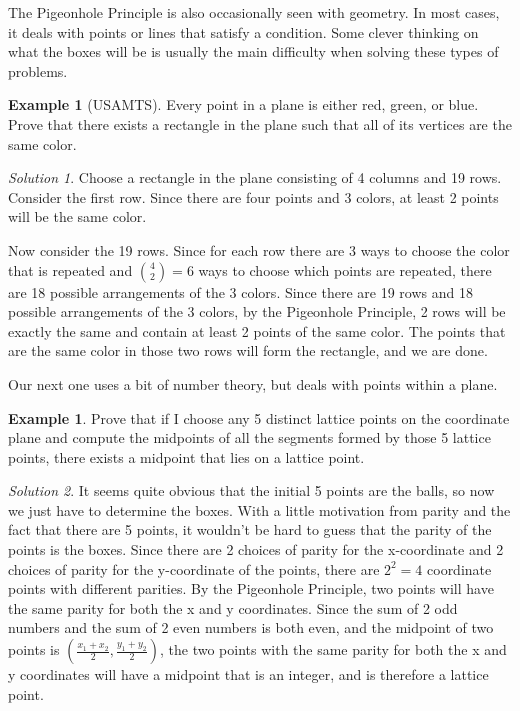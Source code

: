 \documentclass[l1pt]{article}
\theoremstyle{plain}
\theoremstyle{definition}
\newtheorem{example}[thm]{Example}
\theoremstyle{remark}
\newtheorem*{solution}{Solution}
\begin{document}
The Pigeonhole Principle is also occasionally seen with geometry. In most cases, it deals with points or lines that satisfy a condition. Some clever thinking on what the boxes will be is usually the main difficulty when solving these types of problems.

\begin{example}[USAMTS]
Every point in a plane is either red, green, or blue. Prove that there exists a rectangle in the plane such that all of its vertices are the same color.
\end{example}

\begin{solution}
Choose a rectangle in the plane consisting of 4 columns and 19 rows. Consider the first row. Since there are four points and 3 colors, at least 2 points will be the same color. 

Now consider the 19 rows. Since for each row there are 3 ways to choose the color that is repeated and $\binom{4}{2}=6$ ways to choose which points are repeated, there are 18 possible arrangements of the 3 colors. Since there are 19 rows and 18 possible arrangements of the 3 colors, by the Pigeonhole Principle, 2 rows will be exactly the same and contain at least 2 points of the same color. The points that are the same color in those two rows will form the rectangle, and we are done.
\end{solution}

Our next one uses a bit of number theory, but deals with points within a plane.

\begin{example}
Prove that if I choose any 5 distinct lattice points on the coordinate plane and compute the midpoints of all the segments formed by those 5 lattice points, there exists a midpoint that lies on a lattice point.
\end{example}

\begin{solution}
It seems quite obvious that the initial 5 points are the balls, so now we just have to determine the boxes. With a little motivation from parity and the fact that there are 5 points, it wouldn't be hard to guess that the parity of the points is the boxes. Since there are 2 choices of parity for the x-coordinate and 2 choices of parity for the y-coordinate of the points, there are $2^2=4$ coordinate points with different parities. By the Pigeonhole Principle, two points will have the same parity for both the x and y coordinates. Since the sum of 2 odd numbers and the sum of 2 even numbers is both even, and the midpoint of two points is $\left (\frac{x_1+x_2}{2}, \frac{y_1+y_2}{2} \right )$, the two points with the same parity for both the x and y coordinates will have a midpoint that is an integer, and is therefore a lattice point.
\end{solution}
\end{document}
